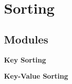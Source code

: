 \section{Sorting}
\label{group__sorting}
\subsection*{Modules}
\begin{CompactItemize}
\item 
{\bf Key Sorting}
\item 
{\bf Key-Value Sorting}
\end{CompactItemize}
